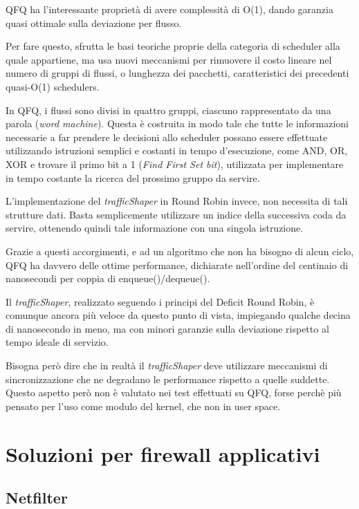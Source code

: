 QFQ ha l'interessante proprietà di avere complessità di O(1), dando garanzia quasi ottimale sulla deviazione per flusso.

Per fare questo, sfrutta le basi teoriche proprie della categoria di scheduler alla quale appartiene, ma usa nuovi meccanismi per rimuovere il costo lineare nel numero di gruppi di flussi, o lunghezza dei pacchetti, caratteristici dei precedenti quasi-O(1) schedulers.

In QFQ, i flussi sono divisi in quattro gruppi, ciascuno rappresentato da una parola (\emph{word machine}). Questa è costruita in modo tale che tutte le informazioni necessarie a far prendere le decisioni allo scheduler possano essere effettuate utilizzando istruzioni semplici e costanti in tempo d'esecuzione, come AND, OR, XOR e trovare il primo bit a 1 (\emph{Find First Set bit}), utilizzata per implementare in tempo costante la ricerca del prossimo gruppo da servire.

L'implementazione del \emph{trafficShaper} in Round Robin invece, non necessita di tali strutture dati. Basta semplicemente utilizzare un indice della successiva coda da servire, ottenendo quindi tale informazione con una singola istruzione.

Grazie a questi accorgimenti, e ad un algoritmo che non ha bisogno di alcun ciclo, QFQ ha davvero delle ottime performance, dichiarate nell'ordine del centinaio di nanosecondi per coppia di enqueue()/dequeue().

Il \emph{trafficShaper}, realizzato seguendo i principi del Deficit Round Robin, è comunque ancora più veloce da questo punto di vista, impiegando qualche decina di nanosecondo in meno, ma con minori garanzie sulla deviazione rispetto al tempo ideale di servizio.

Bisogna però dire che in realtà il \emph{trafficShaper} deve utilizzare meccanismi di sincronizzazione che ne degradano le performance rispetto a quelle suddette. Questo aspetto però non è valutato nei test effettuati su QFQ, forse perchè più pensato per l'uso come modulo del kernel, che non in user space.

\section{Soluzioni per firewall applicativi}

\subsection{Netfilter}

